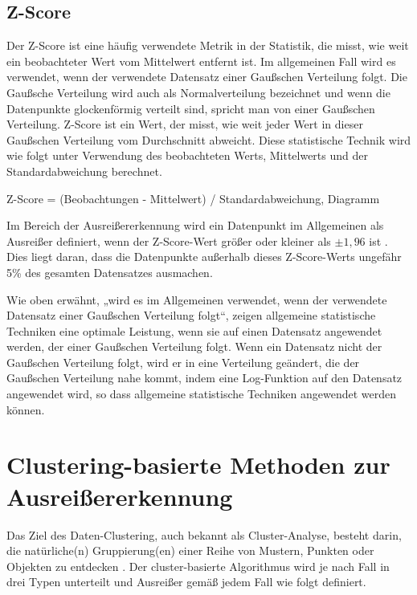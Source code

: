             \subsection{Z-Score}
                Der Z-Score ist eine häufig verwendete Metrik in der Statistik, die misst, wie weit ein beobachteter Wert vom Mittelwert entfernt ist. Im allgemeinen Fall wird es verwendet, wenn der verwendete Datensatz einer Gaußschen Verteilung folgt. Die Gaußsche Verteilung wird auch als Normalverteilung bezeichnet und wenn die Datenpunkte glockenförmig verteilt sind, spricht man von einer Gaußschen Verteilung. Z-Score ist ein Wert, der misst, wie weit jeder Wert in dieser Gaußschen Verteilung vom Durchschnitt abweicht. Diese statistische Technik wird wie folgt unter Verwendung des beobachteten Werts, Mittelwerts und der Standardabweichung berechnet.

                Z-Score = (Beobachtungen - Mittelwert) / Standardabweichung, Diagramm

                Im Bereich der Ausreißererkennung wird ein Datenpunkt im Allgemeinen als Ausreißer definiert, wenn der Z-Score-Wert größer oder kleiner als $\pm1,96$ ist \cite{Killourhy09}. Dies liegt daran, dass die Datenpunkte außerhalb dieses Z-Score-Werts ungefähr 5\% des gesamten Datensatzes ausmachen.
                
                Wie oben erwähnt, „wird es im Allgemeinen verwendet, wenn der verwendete Datensatz einer Gaußschen Verteilung folgt“, zeigen allgemeine statistische Techniken eine optimale Leistung, wenn sie auf einen Datensatz angewendet werden, der einer Gaußschen Verteilung folgt. Wenn ein Datensatz nicht der Gaußschen Verteilung folgt, wird er in eine Verteilung geändert, die der Gaußschen Verteilung nahe kommt, indem eine Log-Funktion auf den Datensatz angewendet wird, so dass allgemeine statistische Techniken angewendet werden können.
                    
                
        \section{Clustering-basierte Methoden zur Ausreißererkennung}
            Das Ziel des Daten-Clustering, auch bekannt als Cluster-Analyse, besteht darin, die natürliche(n) Gruppierung(en) einer Reihe von Mustern, Punkten oder Objekten zu entdecken \cite{Jain10}. Der cluster-basierte Algorithmus wird je nach Fall in drei Typen unterteilt und Ausreißer gemäß jedem Fall wie folgt definiert.


